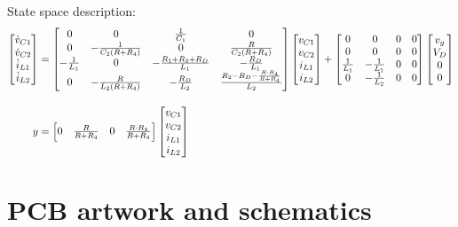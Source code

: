 \endgroup
State space description:
\begin{align*}
\begin{bmatrix}
\dispdot{v_{C1}} \\ \dispdot{v_{C2}} \\ \dispdot{i_{L1}} \\ \dispdot{i_{L2}}
\end{bmatrix}
& =
\begin{bmatrix}
0 & 0 & \frac{1}{C_1} & 0\\
0 & \minus\frac{1}{C_2(R + R_4)} & 0 & \frac{R}{C_2(R + R_4)}\\
\minus\frac{1}{L_1} & 0 & \minus\frac{R_1 + R_3 + R_D}{L_1} & \minus\frac{R_D}{L_1}\\
0 & \minus\frac{R}{L_2(R + R_4)} & \minus\frac{R_D}{L_2} & \frac{R_2 - R_D - \frac{R \cdot R_4}{R + R_4}}{L_2}
\end{bmatrix}
\begin{bmatrix}
v_{C1} \\ v_{C2} \\ i_{L1} \\ i_{L2}
\end{bmatrix}
+
\begin{bmatrix}
0 & 0 & 0 & 0\\
0 & 0 & 0 & 0\\
\frac{1}{L_1} & {-}\frac{1}{L_1} & 0 & 0\\
0 & {-}\frac{1}{L_2} & 0 & 0
\end{bmatrix}
\begin{bmatrix}
v_g \\ V_D \\ 0 \\ 0
\end{bmatrix}
\\[11pt]
y &=
\begin{bmatrix}
0 & \frac{R}{R + R_4} & 0 & \frac{R \cdot R_4}{R + R_4}
\end{bmatrix}
\begin{bmatrix}
v_{C1} \\ v_{C2} \\ i_{L1} \\ i_{L2}
\end{bmatrix}
\end{align*}
\section{PCB artwork and schematics} \label{apn:pcb}
